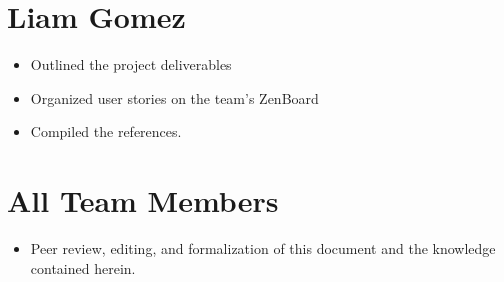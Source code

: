 \documentclass{scrreprt}
\begin{document}
	\section{Liam Gomez}
		\begin{itemize}
			\item Outlined the project deliverables
			\item Organized user stories on the team's ZenBoard
			\item Compiled the references.
		\end{itemize}
	\section{All Team Members}
		\begin{itemize}
			\item Peer review, editing, and formalization of this document and the knowledge contained herein.
		\end{itemize}
\end{document}
